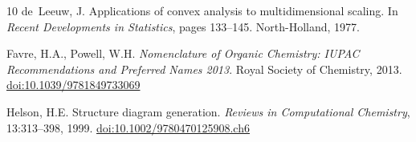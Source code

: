 \documentclass[twocolumn]{article}
\begin{document}
\begin{thebibliography}{10}
de~Leeuw, J.
\newblock Applications of convex analysis to multidimensional scaling.
\newblock In \emph{Recent Developments in Statistics}, pages 133--145.
  North-Holland, 1977.

Favre, H.A., Powell, W.H.
\newblock \emph{Nomenclature of Organic Chemistry: IUPAC Recommendations and
  Preferred Names 2013}.
\newblock Royal Society of Chemistry, 2013.
\newblock \href{https://doi.org/10.1039/9781849733069}{doi:10.1039/9781849733069}

Helson, H.E.
\newblock Structure diagram generation.
\newblock \emph{Reviews in Computational Chemistry}, 13:313--398, 1999.
\newblock \href{https://doi.org/10.1002/9780470125908.ch6}{doi:10.1002/9780470125908.ch6}

\end{thebibliography}
\end{document}
